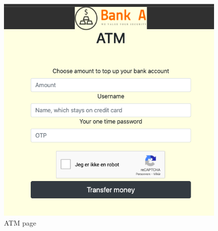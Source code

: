 \begin{figure}[H]
    \centering
    \includegraphics[width=\textwidth]{pics/atmPage.png}
    \caption{ATM page}
    \label{fig:cha1fig3.2atmpage}
\end{figure}